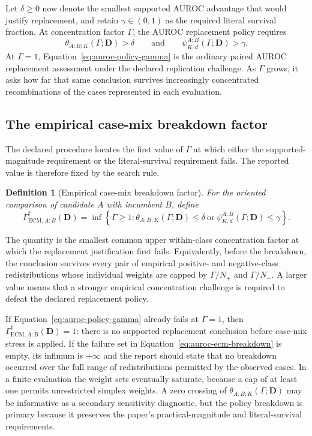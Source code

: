 \documentclass[11pt]{article}
\newtheorem{definition}{Definition}
\theoremstyle{remark}
\begin{document}
Let $\delta\geq0$ now denote the smallest supported AUROC advantage that would
justify replacement, and retain $\gamma\in(0,1)$ as the required literal
survival fraction. At concentration factor $\Gamma$, the AUROC replacement
policy requires
\begin{equation}
\theta_{A:B;K}(\Gamma;\mathbf D)>\delta
\qquad\text{and}\qquad
\psi_{K,d}^{A:B}(\Gamma;\mathbf D)>\gamma.
\label{eq:auroc-policy-gamma}
\end{equation}
At $\Gamma=1$, Equation~\eqref{eq:auroc-policy-gamma} is the ordinary paired
AUROC replacement assessment under the declared replication challenge. As
$\Gamma$ grows, it asks how far that same conclusion survives increasingly
concentrated recombinations of the cases represented in each evaluation.

\subsection{The empirical case-mix breakdown factor}

The declared procedure locates the first value of $\Gamma$ at which either
the supported-magnitude requirement or the literal-survival requirement fails.
The reported value is therefore fixed by the search rule.

\begin{definition}[Empirical case-mix breakdown factor]
For the oriented comparison of candidate $A$ with incumbent $B$, define
\begin{equation}
\Gamma_{\mathrm{ECM},A:B}^{\dagger}(\mathbf D)
=
\inf\left\{
\Gamma\geq1:
\theta_{A:B;K}(\Gamma;\mathbf D)\leq\delta
\ \text{or}\ 
\psi_{K,d}^{A:B}(\Gamma;\mathbf D)\leq\gamma
\right\}.
\label{eq:auroc-ecm-breakdown}
\end{equation}
\end{definition}

The quantity is the smallest common upper within-class concentration factor at
which the replacement justification first fails. Equivalently, before the
breakdown, the conclusion survives every pair of empirical positive- and
negative-class redistributions whose individual weights are capped by
$\Gamma/N_+$ and $\Gamma/N_-$. A larger value means that a stronger empirical
concentration challenge is required to defeat the declared replacement policy.

If Equation~\eqref{eq:auroc-policy-gamma} already fails at $\Gamma=1$, then
$\Gamma_{\mathrm{ECM},A:B}^{\dagger}(\mathbf D)=1$: there is no supported replacement
conclusion before case-mix stress is applied. If the failure set in
Equation~\eqref{eq:auroc-ecm-breakdown} is empty, its infimum is $+\infty$ and
the report should state that no breakdown occurred over the full range of
redistributions permitted by the observed cases. In a finite evaluation the weight sets eventually saturate, because a
cap of at least one permits unrestricted simplex weights. A zero crossing of
$\theta_{A:B;K}(\Gamma;\mathbf D)$ may be informative as a secondary sensitivity
diagnostic, but the policy breakdown is primary because it preserves the
paper's practical-magnitude and literal-survival requirements.
\end{document}
